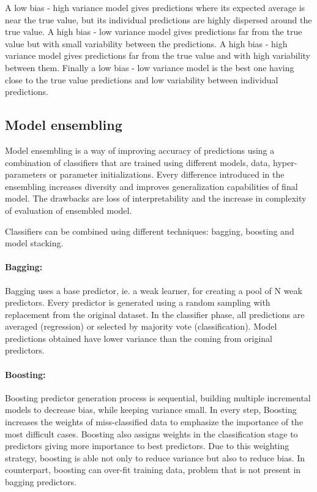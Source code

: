 A low bias - high variance model gives predictions where its expected average is near the true value, but its individual predictions are highly dispersed around the true value. A high bias - low variance model gives predictions far from the true value but with small variability between the predictions. A high bias - high variance model gives predictions far from the true value and with high variability between them. Finally a low bias - low variance model is the best one having close to the true value predictions and low variability between individual predictions.

\subsection{Model ensembling}

Model ensembling \citep{zhou2012ensemble} is a way of improving accuracy of predictions using a combination of classifiers that are trained using different models, data, hyper-parameters or parameter initializations. Every difference introduced in the ensembling increases diversity and improves generalization capabilities of final model. The drawbacks are loss of interpretability and the increase in complexity of evaluation of ensembled model. 

Classifiers can be combined using different techniques: bagging, boosting and model stacking.

\paragraph{Bagging:} Bagging uses a base predictor, ie. a weak learner, for creating a pool of N weak predictors. Every predictor is generated using a random sampling with replacement from the original dataset. In the classifier phase, all predictions are averaged (regression) or selected by majority vote (classification). Model predictions obtained have lower variance than the coming from original predictors.

\paragraph{Boosting:} Boosting predictor generation process is sequential, building multiple incremental models to decrease bias, while keeping variance small. In every step, Boosting increases the weights of miss-classified data to emphasize the importance of the most difficult cases. Boosting also assigns weights in the classification stage to predictors giving more importance to best predictors. Due to this weighting strategy, boosting is able not only to reduce variance but also to reduce bias. In counterpart, boosting can over-fit training data, problem that is not present in bagging predictors.

